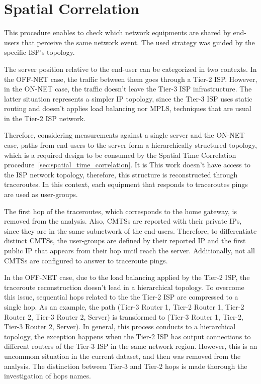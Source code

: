 \section{Spatial Correlation}
\label{sec:spatial_correlation}

This procedure enables to check which network equipments are shared by end-users
that perceive the same network event. The used strategy was guided by the
specific ISP's topology.

The server position relative to the end-user
can be categorized in two contexts.
In the OFF-NET case, the traffic between them
goes through a Tier-2 ISP\@.
However, in the ON-NET case, the traffic
doesn't leave the Tier-3 ISP infrastructure.
The latter situation represents a simpler IP topology, since the Tier-3 ISP
uses static routing and
doesn't applies load balancing nor MPLS, techniques that are usual in the Tier-2
ISP network.

Therefore, considering measurements against a single server and the ON-NET
case, paths from end-users to the server form a hierarchically
structured topology, which is a required design to be consumed by the
Spatial Time Correlation procedure~\ref{sec:spatial_time_correlation}.
It is
This work doesn't have access to the ISP network
topology, therefore, this structure is reconstructed through traceroutes.
In this context, each equipment that responds to traceroutes
pings are used as user-groups.

The first hop of the traceroutes, which corresponds to the home gateway, is
removed from the analysis. Also, CMTSs are reported with their private IPs,
since they are in the same subnetwork of the end-users.
Therefore, to differentiate distinct CMTSs, the
user-groups are defined by their reported IP and the first public IP that
appears from their hop until reach the server. Additionally, not all CMTSs are
configured to answer to traceroute pings.

In the OFF-NET case, due to the load balancing applied by the Tier-2 ISP,
the traceroute reconstruction doesn't lead in a hierarchical topology.
To overcome this issue, sequential hops related to the
the Tier-2 ISP are compressed to a single hop.
As an example, the path (Tier-3 Router 1, Tier-2 Router 1, Tier-2 Router 2,
Tier-3 Router 2, Server) is
transformed to (Tier-3 Router 1, Tier-2, Tier-3 Router 2, Server).
In general, this process conducts to a hierarchical topology,
the exception happens when the Tier-2 ISP has output connections to
different routers of the Tier-3 ISP in the same network region.
However, this is an uncommom situation in
the current dataset, and then was removed from the analysis.
The distinction between
Tier-3 and Tier-2 hops is made thorough the investigation of hops names.

